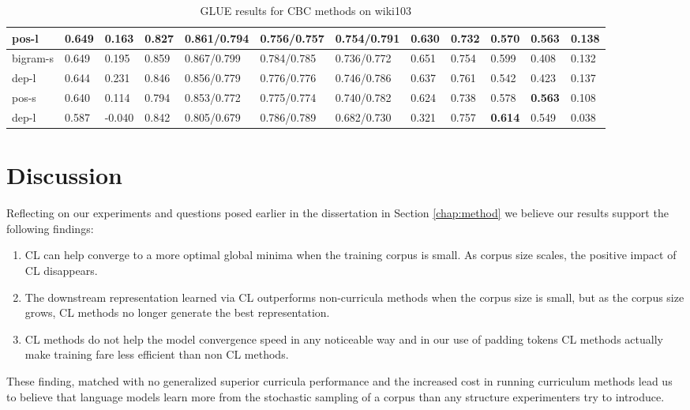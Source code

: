 \begin{table}[]
{\begin{tabular}{|l|l|l|l|l|l|l|l|l|l|l|l|}
pos-l & 0.649 & 0.163 & 0.827 & 0.861/0.794 & 0.756/0.757 & \textbf{0.754}/0.791 & 0.630 & 0.732 & 0.570 & \textbf{0.563} & 0.138 \\ \hline
bigram-s & 0.649 & 0.195 & 0.859 & 0.867/0.799 & 0.784/0.785 & 0.736/0.772 & 0.651 & 0.754 & 0.599 & 0.408 & 0.132 \\\hline
dep-l & 0.644 & 0.231 & 0.846 & 0.856/0.779 & 0.776/0.776 & 0.746/0.786 & 0.637 & 0.761 & 0.542 & 0.423 & 0.137 \\ \hline
pos-s & 0.640 & 0.114 & 0.794 & 0.853/0.772 & 0.775/0.774 & 0.740/0.782 & 0.624 & 0.738 & 0.578 & \textbf{0.563} & 0.108 \\ \hline
dep-l & 0.587 & -0.040 & 0.842 & 0.805/0.679 & 0.786/0.789 & 0.682/0.730 & 0.321 & 0.757 & \textbf{0.614} & 0.549 & 0.038 \\ \hline
\end{tabular}%
}
\caption{GLUE results for CBC methods on wiki103}
\label{tab:glue-wiki-103}
\end{table}
\section{Discussion}
Reflecting on our experiments and questions posed earlier in the dissertation in Section \ref{chap:method} we believe our results support the following findings:
\begin{enumerate}
\item CL can help converge to a more optimal global minima when the training corpus is small. As corpus size scales, the positive impact of CL disappears.
\item The downstream representation learned via CL outperforms non-curricula methods when the corpus size is small, but as the corpus size grows, CL methods no longer generate the best representation.
\item CL methods do not help the model convergence speed in any noticeable way and in our use of padding tokens CL methods actually make training fare less efficient than non CL methods.
\end{enumerate}
These finding, matched with no generalized superior curricula performance and the increased cost in running curriculum methods lead us to believe that language models learn more from the stochastic sampling of a corpus than any structure experimenters try to introduce. 
